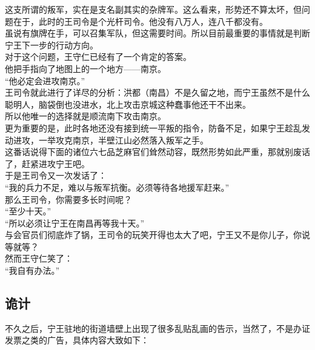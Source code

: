 \begin{multicols}{\theparacolNo}
这支所谓的叛军，实在是支名副其实的杂牌军。这么看来，形势还不算太坏，但问题在于，此时的王司令是个光杆司令。他没有八万人，连八千都没有。\\

虽说有旗牌在手，可以召集军队，但这需要时间。所以目前最重要的事情就是判断宁王下一步的行动方向。\\

对于这个问题，王守仁已经有了一个肯定的答案。\\

他把手指向了地图上的一个地方——南京。\\

“他必定会进攻南京。”\\

王司令就此进行了详尽的分析：洪都（南昌）不是久留之地，而宁王虽然不是什么聪明人，脑袋倒也没进水，北上攻击京城这种蠢事他还干不出来。\\

所以他唯一的选择就是顺流南下攻击南京。\\

更为重要的是，此时各地还没有接到统一平叛的指令，防备不足，如果宁王趁乱发动进攻，一举攻克南京，半壁江山必然落入叛军之手。\\

这番话说得下面的诸位六七品芝麻官们耸然动容，既然形势如此严重，那就别废话了，赶紧进攻宁王吧。\\

于是王司令又一次发话了：\\

“我的兵力不足，难以与叛军抗衡。必须等待各地援军赶来。”\\

那么王司令，你需要多长时间呢？\\

“至少十天。”\\

“所以必须让宁王在南昌再等我十天。”\\

与会官员们彻底炸了锅，王司令的玩笑开得也太大了吧，宁王又不是你儿子，你说等就等？\\

然而王守仁笑了：\\

“我自有办法。”\\

\subsection{诡计}
不久之后，宁王驻地的街道墙壁上出现了很多乱贴乱画的告示，当然了，不是办证发票之类的广告，具体内容大致如下：\\


\end{multicols}
